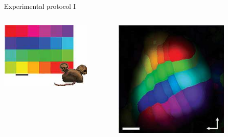 \begin{frame}[c]{Experimental protocol I}
  \begin{columns}
    \begin{column}{0.5\textwidth}
      \centering
      \includegraphics[width=0.8\textwidth]{99_images/keck-1-1a}%
    \end{column}
    \begin{column}{0.5\textwidth}
      \centering
      \includegraphics[width=0.8\textwidth]{99_images/keck-1-1c}%
    \end{column}
  \end{columns}
\end{frame}

